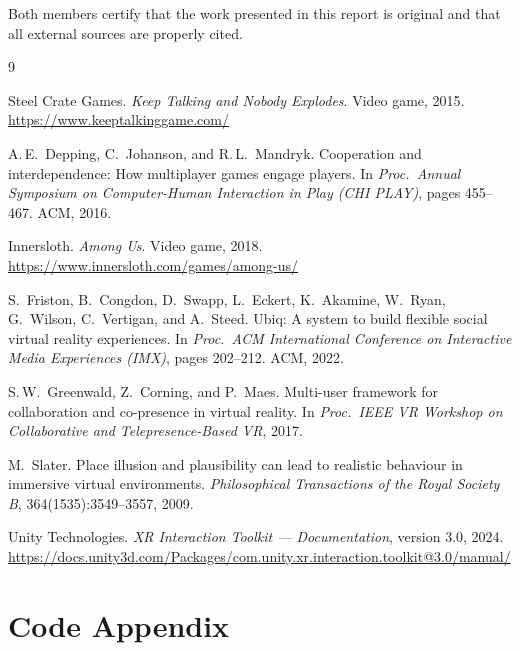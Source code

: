 \documentclass[12pt,a4paper]{article}
\begin{document}
Both members certify that the work presented in this report is original and that all external sources are properly cited.

\newpage

\begin{thebibliography}{9}

Steel Crate Games.
\newblock \textit{Keep Talking and Nobody Explodes}.
\newblock Video game, 2015.
\newblock \url{https://www.keeptalkinggame.com/}

A.\,E.~Depping, C.~Johanson, and R.\,L.~Mandryk.
\newblock Cooperation and interdependence: How multiplayer games engage players.
\newblock In \textit{Proc.\ Annual Symposium on Computer-Human Interaction in Play (CHI PLAY)}, pages 455--467. ACM, 2016.

Innersloth.
\newblock \textit{Among Us}.
\newblock Video game, 2018.
\newblock \url{https://www.innersloth.com/games/among-us/}

S.~Friston, B.~Congdon, D.~Swapp, L.~Eckert, K.~Akamine, W.~Ryan,
G.~Wilson, C.~Vertigan, and A.~Steed.
\newblock Ubiq: A system to build flexible social virtual reality experiences.
\newblock In \textit{Proc.\ ACM International Conference on Interactive Media Experiences (IMX)}, pages 202--212. ACM, 2022.

S.\,W.~Greenwald, Z.~Corning, and P.~Maes.
\newblock Multi-user framework for collaboration and co-presence in virtual reality.
\newblock In \textit{Proc.\ IEEE VR Workshop on Collaborative and Telepresence-Based VR}, 2017.

M.~Slater.
\newblock Place illusion and plausibility can lead to realistic behaviour in
  immersive virtual environments.
\newblock \textit{Philosophical Transactions of the Royal Society B}, 364(1535):3549--3557, 2009.

Unity Technologies.
\newblock \textit{XR Interaction Toolkit — Documentation}, version 3.0, 2024.
\newblock \url{https://docs.unity3d.com/Packages/com.unity.xr.interaction.toolkit@3.0/manual/}

\end{thebibliography}

\newpage
\section*{Code Appendix}
\end{document}
